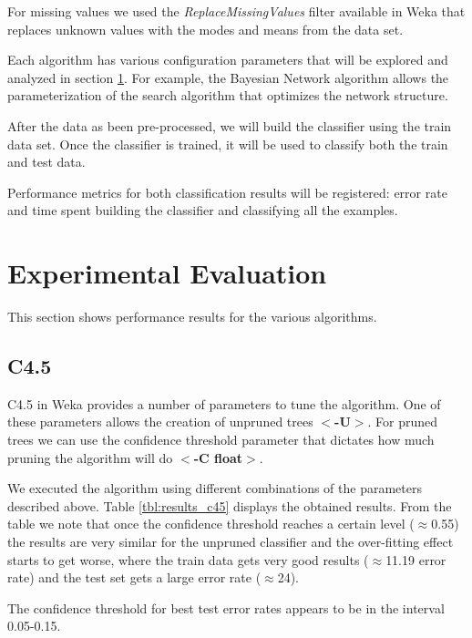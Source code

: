 \documentclass[a4paper]{llncs}
\begin{document}
For missing values we used the \textit{ReplaceMissingValues} filter available in Weka that
replaces unknown values with the modes and means from the data set. 

Each algorithm has various configuration parameters that will be explored
and analyzed in section \ref{sec:experimental_eval}.
For example, the Bayesian Network
algorithm allows the parameterization of the search algorithm that optimizes the network structure.

After the data as been pre-processed,
we will build the classifier using the train data set.
Once the classifier is trained, it will be used to classify both the train and test data.

Performance metrics for both classification results will be registered: error rate and time spent
building the classifier and classifying all the examples.

\section{Experimental Evaluation} \label{sec:experimental_eval}

This section shows performance results for the various algorithms.

\subsection{C4.5}

C4.5 in Weka provides a number of parameters to tune the algorithm.
One of these parameters allows the creation of unpruned trees $<$\textbf{-U}$>$.
For pruned trees we can use the confidence threshold parameter that dictates how
much pruning the algorithm will do $<$\textbf{-C float}$>$.

We executed the algorithm using different combinations of the parameters described above.
Table \ref{tbl:results_c45} displays the obtained results. From the table
we note that once the confidence threshold reaches a certain level ($\approx$0.55) the results
are very similar for the unpruned classifier and the over-fitting effect starts to get worse,
where the train data gets very good results ($\approx$11.19 error rate) and the test set gets a
large error rate ($\approx$24).

The confidence threshold for best test error rates appears to be in the interval 0.05-0.15.   
\end{document}
